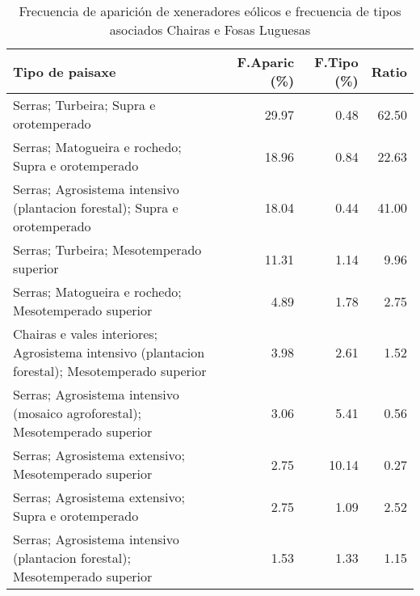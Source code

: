\begin{table}[p]
\centering
\caption{Frecuencia de aparición de xeneradores eólicos e frecuencia de tipos asociados Chairas e Fosas Luguesas} 
\label{veolico6}
\begin{tabular}{lrrr}
  \hline
Tipo de paisaxe & F.Aparic (\%) & F.Tipo (\%) & Ratio \\ 
  \hline
Serras; Turbeira; Supra e orotemperado & 29.97 & 0.48 & 62.50 \\ 
  Serras; Matogueira e rochedo; Supra e orotemperado & 18.96 & 0.84 & 22.63 \\ 
  Serras; Agrosistema intensivo (plantacion forestal); Supra e orotemperado & 18.04 & 0.44 & 41.00 \\ 
  Serras; Turbeira; Mesotemperado superior & 11.31 & 1.14 & 9.96 \\ 
  Serras; Matogueira e rochedo; Mesotemperado superior & 4.89 & 1.78 & 2.75 \\ 
  Chairas e vales interiores; Agrosistema intensivo (plantacion forestal); Mesotemperado superior & 3.98 & 2.61 & 1.52 \\ 
  Serras; Agrosistema intensivo (mosaico agroforestal); Mesotemperado superior & 3.06 & 5.41 & 0.56 \\ 
  Serras; Agrosistema extensivo; Mesotemperado superior & 2.75 & 10.14 & 0.27 \\ 
  Serras; Agrosistema extensivo; Supra e orotemperado & 2.75 & 1.09 & 2.52 \\ 
  Serras; Agrosistema intensivo (plantacion forestal); Mesotemperado superior & 1.53 & 1.33 & 1.15 \\ 
   \hline
\end{tabular}
\end{table}

